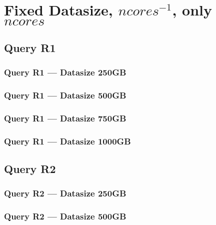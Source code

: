 \newpage
\section{Fixed Datasize, $ncores^{-1}$, only $ncores$}
\subsection{Query R1}
\subsubsection{Query R1 --- Datasize 250GB}



\newpage
\subsubsection{Query R1 --- Datasize 500GB}



\newpage
\subsubsection{Query R1 --- Datasize 750GB}



\newpage
\subsubsection{Query R1 --- Datasize 1000GB}



\newpage
\subsection{Query R2}
\subsubsection{Query R2 --- Datasize 250GB}



\newpage
\subsubsection{Query R2 --- Datasize 500GB}



